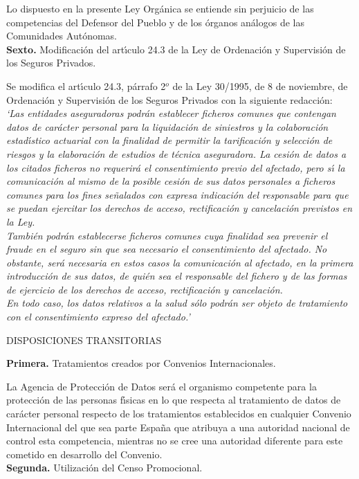 Lo dispuesto en la presente Ley Org\'anica se entiende sin perjuicio de las 
competencias del Defensor del Pueblo y de los \'organos an\'alogos de las 
Comunidades Aut\'onomas.
\vspace{0.3cm}\\
{\large {\bf Sexto.} Modificaci\'on del art\'{\i}culo 24.3 de la Ley de 
Ordenaci\'on y Supervisi\'on de los Seguros Privados.}

Se modifica el art\'{\i}culo 24.3, p\'arrafo 2$^{o}$ de la Ley 30/1995, de 8 de 
noviembre, de Ordenaci\'on y Supervisi\'on de los Seguros Privados con la 
siguiente redacci\'on:\\
{\it `Las entidades aseguradoras podr\'an establecer ficheros comunes que 
contengan datos de car\'acter personal para la liquidaci\'on de siniestros y la 
colaboraci\'on estad\'{\i}stico actuarial con la finalidad de permitir la 
tarificaci\'on y selecci\'on de riesgos y la elaboraci\'on de estudios de 
t\'ecnica aseguradora. La cesi\'on de datos a los citados ficheros no 
requerir\'a el consentimiento previo del afectado, pero s\'{\i} la 
comunicaci\'on al mismo de la posible cesi\'on de sus datos personales a 
ficheros comunes para los fines se\~nalados con expresa indicaci\'on del 
responsable para que se puedan ejercitar los derechos de acceso, 
rectificaci\'on y cancelaci\'on previstos en la Ley.\\
Tambi\'en podr\'an establecerse ficheros comunes cuya finalidad sea prevenir el 
fraude en el seguro sin que sea necesario el consentimiento del afectado. No 
obstante, ser\'a necesaria en estos casos la comunicaci\'on al afectado, en la 
primera introducci\'on de sus datos, de qui\'en sea el responsable del fichero 
y de las formas de ejercicio de los derechos de acceso, rectificaci\'on y 
cancelaci\'on.\\
En todo caso, los datos relativos a la salud s\'olo podr\'an ser objeto de 
tratamiento con el consentimiento expreso del afectado.'}
\begin{center}
{\LARGE DISPOSICIONES TRANSITORIAS}
\end{center}
\vspace{0.3cm}
{\large {\bf Primera.} Tratamientos creados por Convenios Internacionales.}

La Agencia de Protecci\'on de Datos ser\'a el organismo competente para la 
protecci\'on de las personas f\'{\i}sicas en lo que respecta al tratamiento de 
datos de car\'acter personal respecto de los tratamientos establecidos en 
cualquier Convenio Internacional del que sea parte Espa\~na que atribuya a una 
autoridad nacional de control esta competencia, mientras no se cree una 
autoridad diferente para este cometido en desarrollo del Convenio.
\vspace{0.3cm}\\
{\large {\bf Segunda.} Utilizaci\'on del Censo Promocional.}

